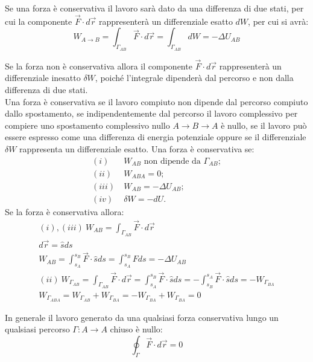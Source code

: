 \documentclass{article}
\numberwithin{equation}{subsection}
\begin{document}
Se una forza è conservativa il lavoro sarà dato da una differenza di due stati, per cui la componente $\vec{F}\cdot d\vec{r}$ rappresenterà un differenziale esatto $dW$, per 
cui si avrà: 
\begin{equation}
    W_{A\to B}=\displaystyle\int_{\Gamma_{AB}}\vec{F}\cdot  d\vec{r}=\int_{\Gamma_{AB}}dW=-\Delta U_{AB}
\end{equation}

Se la forza non è conservativa allora il componente $\vec{F}\cdot d\vec{r}$ rappresenterà un differenziale inesatto $\delta W$, poiché l'integrale dipenderà dal percorso 
e non dalla differenza di due stati. 
\\
Una forza è conservativa se il lavoro compiuto non dipende dal percorso compiuto dallo spostamento, se indipendentemente dal percorso il lavoro complessivo per compiere uno 
spostamento complessivo nullo $A\to B\to A$ è nullo, se il lavoro può essere espresso come una differenza di energia potenziale oppure se il differenziale $\delta W$ rappresenta un 
differenziale esatto. 
Una forza è conservativa se:
\begin{align*}
    (i)\:& W_{AB} \mbox{ non dipende da }\Gamma_{AB};\\
    (ii)\:&W_{ABA}=0;\\
    (iii)\:& W_{AB}=-\Delta U_{AB};\\
    (iv)\:& \delta W =-dU.
\end{align*}
Se la forza è conservativa allora:
\begin{gather*}
    (i),(iii)\:W_{AB}=\displaystyle\int_{\Gamma_{AB}}\vec{F}\cdot d\vec{r}\\
    d\vec{r}=\hat{s}ds\\
    W_{AB}=\int_{s_A}^{s_B}\vec{F}\cdot\hat{s}ds=\int_{s_A}^{s_B}F ds=-\Delta U_{AB} \\
    (ii)\:W_{\Gamma_{AB}}=\displaystyle\int_{\Gamma_{AB}}\vec{F}\cdot d\vec{r}=\int_{s_A}^{s_B}\vec{F}\cdot\hat{s}ds=-\int_{s_B}^{s_A}\vec{F}\cdot\hat{s}ds=-W_{\Gamma_{BA}}\\
    W_{\Gamma_{ABA}}=W_{\Gamma_{AB}}+W_{\Gamma_{BA}}=-W_{\Gamma_{BA}}+W_{\Gamma_{BA}}=0
\end{gather*}

In generale il lavoro generato da una qualsiasi forza conservativa lungo un qualsiasi percorso $\Gamma: A\to A $ chiuso è nullo:
\begin{equation*}
    \oint_{\Gamma}\vec{F}\cdot d\vec{r}=0
\end{equation*}
\end{document}

